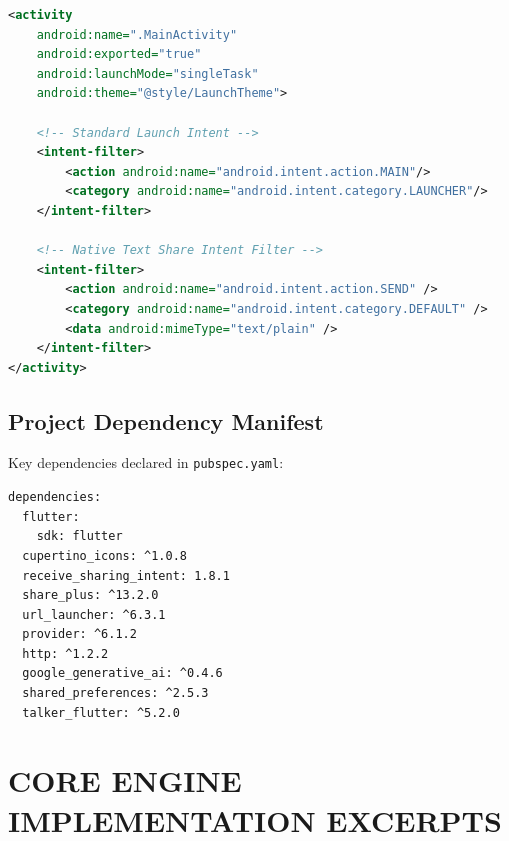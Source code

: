 \documentclass[12pt,a4paper]{report}
\begin{document}
\begin{lstlisting}[language=XML, caption={AndroidManifest.xml Intent Filter Configuration}]
<activity
    android:name=".MainActivity"
    android:exported="true"
    android:launchMode="singleTask"
    android:theme="@style/LaunchTheme">
    
    <!-- Standard Launch Intent -->
    <intent-filter>
        <action android:name="android.intent.action.MAIN"/>
        <category android:name="android.intent.category.LAUNCHER"/>
    </intent-filter>

    <!-- Native Text Share Intent Filter -->
    <intent-filter>
        <action android:name="android.intent.action.SEND" />
        <category android:name="android.intent.category.DEFAULT" />
        <data android:mimeType="text/plain" />
    </intent-filter>
</activity>
\end{lstlisting}

\section{Project Dependency Manifest}
Key dependencies declared in \texttt{pubspec.yaml}:
\begin{lstlisting}[language=bash, caption={pubspec.yaml Excerpt}]
dependencies:
  flutter:
    sdk: flutter
  cupertino_icons: ^1.0.8
  receive_sharing_intent: 1.8.1
  share_plus: ^13.2.0
  url_launcher: ^6.3.1
  provider: ^6.1.2
  http: ^1.2.2
  google_generative_ai: ^0.4.6
  shared_preferences: ^2.5.3
  talker_flutter: ^5.2.0
\end{lstlisting}

\chapter{CORE ENGINE IMPLEMENTATION EXCERPTS}
\end{document}
